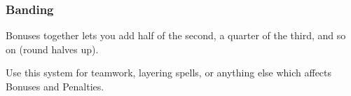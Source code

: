 \subsubsection{Banding}
Bonuses together lets you add half of the second, a quarter of the third, and so on
(round halves up).


Use this system for teamwork, layering spells, or anything else which affects Bonuses and Penalties.
